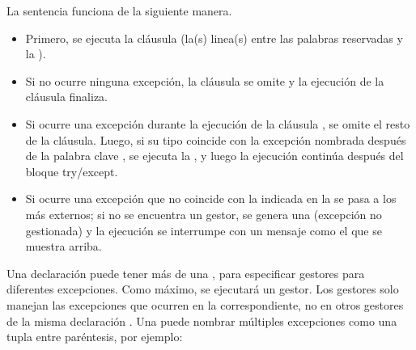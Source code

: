\documentclass[a5paper,10pt,spanish]{sphinxmanual}
\begin{document}
\sphinxAtStartPar
La sentencia  funciona de la siguiente manera.
\begin{itemize}
\item {} 
\sphinxAtStartPar
Primero, se ejecuta la cláusula  (la(s) linea(s) entre las palabras reservadas  y la ).

\item {} 
\sphinxAtStartPar
Si no ocurre ninguna excepción, la cláusula  se omite y la ejecución de la cláusula  finaliza.

\item {} 
\sphinxAtStartPar
Si ocurre una excepción durante la ejecución de la cláusula , se omite el resto de la cláusula. Luego, si su tipo coincide con la excepción nombrada después de la palabra clave , se ejecuta la , y luego la ejecución continúa después del bloque try/except.

\item {} 
\sphinxAtStartPar
Si ocurre una excepción que no coincide con la indicada en la  se pasa a los  más externos; si no se encuentra un gestor, se genera una  (excepción no gestionada) y la ejecución se interrumpe con un mensaje como el que se muestra arriba.

\end{itemize}

\sphinxAtStartPar
Una declaración  puede tener más de una , para especificar gestores para diferentes excepciones. Como máximo, se ejecutará un gestor. Los gestores solo manejan las excepciones que ocurren en la  correspondiente, no en otros gestores de la misma declaración . Una  puede nombrar múltiples excepciones como una tupla entre paréntesis, por ejemplo:

\begin{sphinxVerbatim}[commandchars=\\\{\}]
    
     
\end{sphinxVerbatim}
\end{document}
